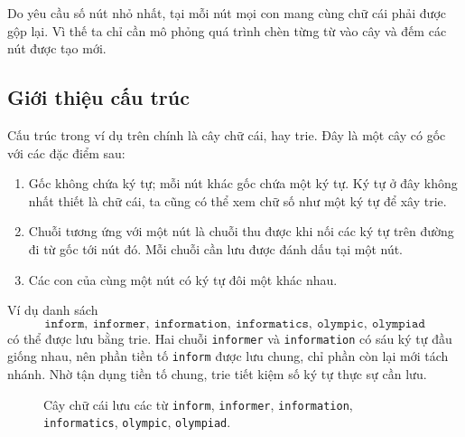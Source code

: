 \documentclass[11pt]{article}
\begin{document}
Do yêu cầu số nút nhỏ nhất, tại mỗi nút mọi con mang cùng chữ cái phải được
gộp lại. Vì thế ta chỉ cần mô phỏng quá trình chèn từng từ vào cây và đếm các
nút được tạo mới.

\subsection{Giới thiệu cấu trúc}

Cấu trúc trong ví dụ trên chính là cây chữ cái, hay trie. Đây là một cây có
gốc với các đặc điểm sau:
\begin{enumerate}
  \item Gốc không chứa ký tự; mỗi nút khác gốc chứa một ký tự. Ký tự ở đây
  không nhất thiết là chữ cái, ta cũng có thể xem chữ số như một ký tự để xây
  trie.
  \item Chuỗi tương ứng với một nút là chuỗi thu được khi nối các ký tự trên
  đường đi từ gốc tới nút đó. Mỗi chuỗi cần lưu được đánh dấu tại một nút.
  \item Các con của cùng một nút có ký tự đôi một khác nhau.
\end{enumerate}

Ví dụ danh sách
\[
  \texttt{inform},\ \texttt{informer},\ \texttt{information},\
  \texttt{informatics},\ \texttt{olympic},\ \texttt{olympiad}
\]
có thể được lưu bằng trie. Hai chuỗi \texttt{informer} và
\texttt{information} có sáu ký tự đầu giống nhau, nên phần tiền tố
\texttt{inform} được lưu chung, chỉ phần còn lại mới tách nhánh. Nhờ tận dụng
tiền tố chung, trie tiết kiệm số ký tự thực sự cần lưu.

\begin{figure}[htbp]
\centering
{}
\caption{Cây chữ cái lưu các từ \texttt{inform}, \texttt{informer}, \texttt{information}, \texttt{informatics}, \texttt{olympic}, \texttt{olympiad}.}
\end{figure}
\end{document}
